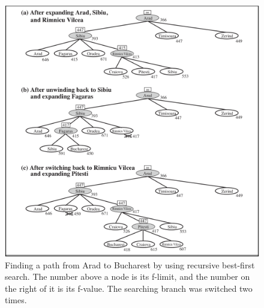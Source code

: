 \begin{figure}[ht]
    \centering
    \includegraphics[width=.8\linewidth]{fig/rbfs.png}
    \caption{Finding a path from Arad to Bucharest by using recursive best-first search. The number above a node is its f-limit, and the number on the right of it is its f-value. The searching branch was switched two times. \cite{aima2020}} 
    \label{fig:rbfs}
\end{figure}

